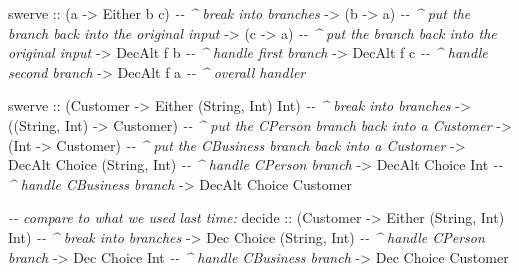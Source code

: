 \documentclass[]{article}
\newenvironment{Shaded}{}{}
\newcommand{\CommentTok}[1]{\textcolor[rgb]{0.38,0.63,0.69}{\textit{#1}}}
\newcommand{\DataTypeTok}[1]{\textcolor[rgb]{0.56,0.13,0.00}{#1}}
\newcommand{\NormalTok}[1]{#1}
\newcommand{\OtherTok}[1]{\textcolor[rgb]{0.00,0.44,0.13}{#1}}
\begin{document}
\begin{Shaded}
\begin{Highlighting}[]
\NormalTok{swerve}
\OtherTok{    ::}\NormalTok{ (a }\OtherTok{{-}\textgreater{}} \DataTypeTok{Either}\NormalTok{ b c)    }\CommentTok{{-}{-} \^{} break into branches}
    \OtherTok{{-}\textgreater{}}\NormalTok{ (b }\OtherTok{{-}\textgreater{}}\NormalTok{ a)             }\CommentTok{{-}{-} \^{} put the branch back into the original input}
    \OtherTok{{-}\textgreater{}}\NormalTok{ (c }\OtherTok{{-}\textgreater{}}\NormalTok{ a)             }\CommentTok{{-}{-} \^{} put the branch back into the original input}
    \OtherTok{{-}\textgreater{}} \DataTypeTok{DecAlt}\NormalTok{ f b           }\CommentTok{{-}{-} \^{} handle first branch}
    \OtherTok{{-}\textgreater{}} \DataTypeTok{DecAlt}\NormalTok{ f c           }\CommentTok{{-}{-} \^{} handle second branch}
    \OtherTok{{-}\textgreater{}} \DataTypeTok{DecAlt}\NormalTok{ f a           }\CommentTok{{-}{-} \^{} overall handler}

\NormalTok{swerve}
\OtherTok{    ::}\NormalTok{ (}\DataTypeTok{Customer} \OtherTok{{-}\textgreater{}} \DataTypeTok{Either}\NormalTok{ (}\DataTypeTok{String}\NormalTok{, }\DataTypeTok{Int}\NormalTok{) }\DataTypeTok{Int}\NormalTok{)   }\CommentTok{{-}{-} \^{} break into branches}
    \OtherTok{{-}\textgreater{}}\NormalTok{ ((}\DataTypeTok{String}\NormalTok{, }\DataTypeTok{Int}\NormalTok{) }\OtherTok{{-}\textgreater{}} \DataTypeTok{Customer}\NormalTok{)              }\CommentTok{{-}{-} \^{} put the CPerson branch back into a Customer}
    \OtherTok{{-}\textgreater{}}\NormalTok{ (}\DataTypeTok{Int} \OtherTok{{-}\textgreater{}} \DataTypeTok{Customer}\NormalTok{)                        }\CommentTok{{-}{-} \^{} put the CBusiness branch back into a Customer}
    \OtherTok{{-}\textgreater{}} \DataTypeTok{DecAlt} \DataTypeTok{Choice}\NormalTok{ (}\DataTypeTok{String}\NormalTok{, }\DataTypeTok{Int}\NormalTok{)              }\CommentTok{{-}{-} \^{} handle CPerson branch}
    \OtherTok{{-}\textgreater{}} \DataTypeTok{DecAlt} \DataTypeTok{Choice} \DataTypeTok{Int}                        \CommentTok{{-}{-} \^{} handle CBusiness branch}
    \OtherTok{{-}\textgreater{}} \DataTypeTok{DecAlt} \DataTypeTok{Choice} \DataTypeTok{Customer}

\CommentTok{{-}{-} compare to what we used last time:}
\NormalTok{decide}
\OtherTok{    ::}\NormalTok{ (}\DataTypeTok{Customer} \OtherTok{{-}\textgreater{}} \DataTypeTok{Either}\NormalTok{ (}\DataTypeTok{String}\NormalTok{, }\DataTypeTok{Int}\NormalTok{) }\DataTypeTok{Int}\NormalTok{)   }\CommentTok{{-}{-} \^{} break into branches}
    \OtherTok{{-}\textgreater{}} \DataTypeTok{Dec} \DataTypeTok{Choice}\NormalTok{ (}\DataTypeTok{String}\NormalTok{, }\DataTypeTok{Int}\NormalTok{)                 }\CommentTok{{-}{-} \^{} handle CPerson branch}
    \OtherTok{{-}\textgreater{}} \DataTypeTok{Dec} \DataTypeTok{Choice} \DataTypeTok{Int}                           \CommentTok{{-}{-} \^{} handle CBusiness branch}
    \OtherTok{{-}\textgreater{}} \DataTypeTok{Dec} \DataTypeTok{Choice} \DataTypeTok{Customer}
\end{Highlighting}
\end{Shaded}
\end{document}
